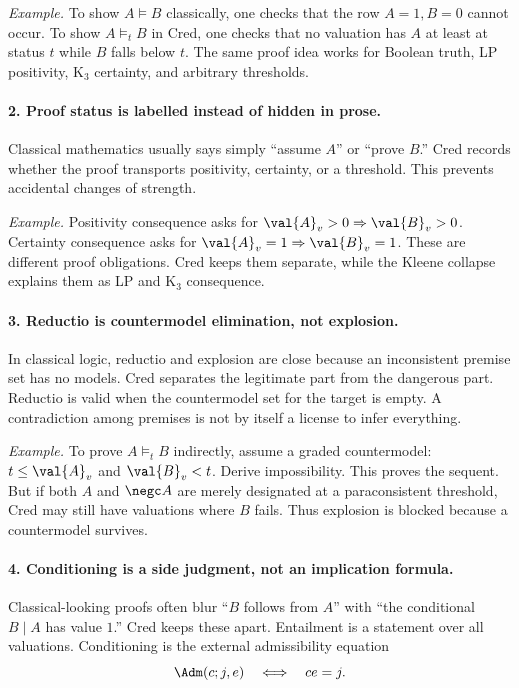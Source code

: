 \emph{Example.}  To show $A\models B$ classically, one checks that the
row $A=1,B=0$ cannot occur.  To show $A\models_t B$ in Cred, one checks
that no valuation has $A$ at least at status $t$ while $B$ falls below
$t$.  The same proof idea works for Boolean truth, LP positivity, K$_3$
certainty, and arbitrary thresholds.

\paragraph{2. Proof status is labelled instead of hidden in prose.}
Classical mathematics usually says simply ``assume $A$'' or ``prove
$B$.''  Cred records whether the proof transports positivity, certainty,
or a threshold.  This prevents accidental changes of strength.

\emph{Example.}  Positivity consequence asks for $\val{A}_v>0\Rightarrow
\val{B}_v>0$.  Certainty consequence asks for $\val{A}_v=1\Rightarrow
\val{B}_v=1$.  These are different proof obligations.  Cred keeps them
separate, while the Kleene collapse explains them as LP and K$_3$
consequence.

\paragraph{3. Reductio is countermodel elimination, not explosion.}
In classical logic, reductio and explosion are close because an
inconsistent premise set has no models.  Cred separates the legitimate
part from the dangerous part.  Reductio is valid when the countermodel
set for the target is empty.  A contradiction among premises is not by
itself a license to infer everything.

\emph{Example.}  To prove $A\models_t B$ indirectly, assume a graded
countermodel: $t\le\val{A}_v$ and $\val{B}_v<t$.  Derive impossibility.
This proves the sequent.  But if both $A$ and $\negc A$ are merely
designated at a paraconsistent threshold, Cred may still have valuations
where $B$ fails.  Thus explosion is blocked because a countermodel
survives.

\paragraph{4. Conditioning is a side judgment, not an implication formula.}
Classical-looking proofs often blur ``$B$ follows from $A$'' with
``the conditional $B\mid A$ has value $1$.''  Cred keeps these apart.
Entailment is a statement over all valuations.  Conditioning is the
external admissibility equation
\[
  \Adm(c;j,e)\quad\Longleftrightarrow\quad c e=j.
\]

